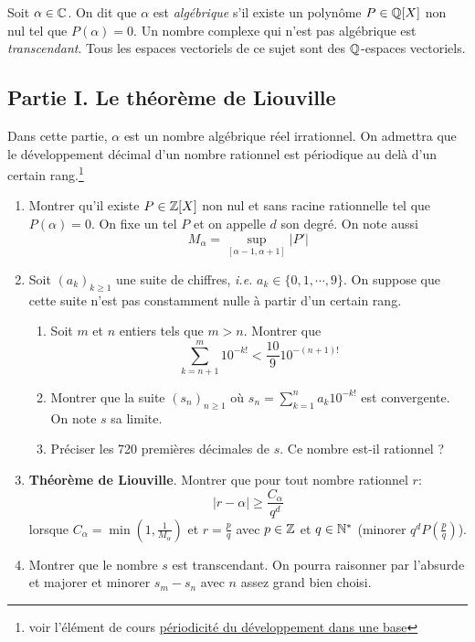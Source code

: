 Soit $\alpha \in \mathbb{C}$. On dit que $\alpha$ est \textit{algébrique} s'il existe un polynôme $P\in \mathbb{Q}[X]$ non nul tel que
$P(\alpha)=0$. Un nombre complexe qui n'est pas algébrique est \textit{transcendant}. Tous les espaces vectoriels de ce sujet
sont des $\mathbb{Q}$-espaces vectoriels.

\subsection*{Partie I. Le théorème de Liouville}

Dans cette partie, $\alpha$ est un nombre algébrique réel irrationnel. On admettra que le développement décimal d'un nombre rationnel est périodique au delà d'un certain rang.\footnote{voir l'élément de cours \href{http:\/back.maquisoc.net\/data\/cours_nicolair/C2142.pdf}{périodicité du développement dans une base}}
\begin{enumerate}
\item Montrer qu'il existe $P \in \mathbb{Z}[X]$ non nul et sans racine rationnelle tel que $P(\alpha)=0$.  On fixe un tel $P$
et on appelle $d$ son degré. On note aussi 
\begin{displaymath}
M_\alpha = \sup_{[\alpha - 1, \alpha +1]} |P'| 
\end{displaymath}

\item Soit $(a_k)_{k\geq 1}$ une suite de chiffres,
\textit{i.e.} $a_k\in\{0,1,\cdots,9\}$.
On suppose que cette suite n'est pas constamment nulle à partir d'un certain rang.
\begin{enumerate}
  \item Soit $m$ et $n$ entiers tels que $m> n$. Montrer que
\begin{displaymath}
\sum_{k=n+1}^{m}10^{-k!}<\frac{10}{9}10^{-(n+1)!} 
\end{displaymath}

  \item Montrer que la suite $(s_n)_{n\geq 1}$ où $\displaystyle s_n = \sum_{k=1}^{n}a_k 10^{-k!}$
  est convergente. On note $s$ sa limite.
  \item Préciser les 720 premières décimales de $s$. Ce nombre est-il rationnel ?
\end{enumerate}
\item \textbf{Théorème de Liouville}. Montrer que pour tout nombre rationnel $r$:
\begin{displaymath}
|r-\alpha|\geq \frac{C_\alpha}{q^d} 
\end{displaymath}
lorsque $C_\alpha=\min (1,\frac{1}{M_\alpha})$ et $r=\frac{p}{q}$ avec $p\in \mathbb{Z}$ et $q\in \mathbb{N}^*$ (minorer $q^dP\left(\frac{p}{q}\right)$).

\item Montrer que le nombre $s$ est transcendant. On pourra raisonner par l'absurde et majorer et
minorer $s_m - s_n$ avec $n$ assez grand bien choisi.
\end{enumerate}

